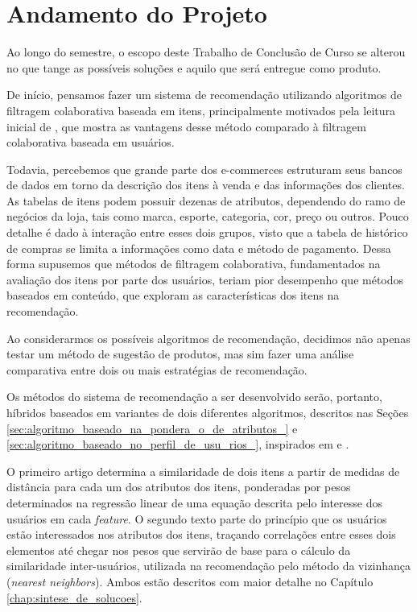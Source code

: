 \chapter[Andamento do Projeto]{Andamento do Projeto}
\label{chap:andamento_do_projeto}


Ao longo do semestre, o escopo deste Trabalho de Conclusão de Curso se alterou no que tange as possíveis soluções e aquilo que será entregue como produto.

De início, pensamos fazer um sistema de recomendação utilizando algoritmos de filtragem colaborativa baseada em itens, principalmente motivados pela leitura inicial de \cite{linden2003amazon}, que mostra as vantagens desse método comparado à filtragem colaborativa baseada em usuários. 

Todavia, percebemos que grande parte dos e-commerces estruturam seus bancos de dados em torno da descrição dos itens à venda e das informações dos clientes. As tabelas de itens podem possuir dezenas de atributos, dependendo do ramo de negócios da loja, tais como marca, esporte, categoria, cor, preço ou outros. Pouco detalhe é dado à interação entre esses dois grupos, visto que a tabela de histórico de compras se limita a informações como data e método de pagamento. Dessa forma supusemos que métodos de filtragem colaborativa, fundamentados na avaliação dos itens por parte dos usuários, teriam pior desempenho que métodos baseados em conteúdo, que exploram as características dos itens na recomendação. 

Ao considerarmos os possíveis algoritmos de recomendação, decidimos  não apenas testar um método de sugestão de produtos, mas sim fazer uma análise comparativa entre dois ou mais estratégias de recomendação. 

Os métodos do sistema de recomendação a ser desenvolvido serão, portanto, híbridos baseados em variantes de dois diferentes algoritmos, descritos nas Seções \ref{sec:algoritmo_baseado_na_pondera_o_de_atributos_} e \ref{sec:algoritmo_baseado_no_perfil_de_usu_rios_}, inspirados em \cite{symeonidis2007feature} e \cite{debnath2008feature}.

O primeiro artigo determina a similaridade de dois itens a partir de medidas de distância para cada um dos atributos dos itens, ponderadas por pesos determinados na regressão linear de uma equação descrita pelo interesse dos usuários em cada \textit{feature}. O segundo texto parte do princípio que os usuários estão interessados nos atributos dos itens, traçando correlações entre esses dois elementos até chegar nos pesos que servirão de base para o cálculo da similaridade inter-usuários, utilizada na recomendação pelo método da vizinhança (\textit{nearest neighbors}). Ambos estão descritos com maior detalhe no Capítulo \ref{chap:sintese_de_solucoes}.
